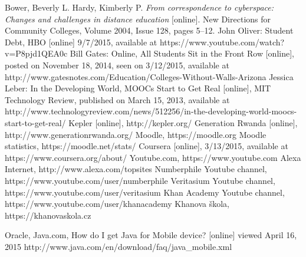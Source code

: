 
\def\bibname{Bibliography}
\begin{thebibliography}{99}
\addcontentsline{toc}{chapter}{\bibname}


{\sc Bower,} Beverly L. {\sc Hardy,} Kimberly P.
\emph{From correspondence to cyberspace: Changes and challenges in distance education} [online].
New Directions for Community Colleges, Volume 2004, Issue 128, pages 5–12.
John Oliver: Student Debt, HBO [online] 9/7/2015, available at https://www.youtube.com/watch?v=P8pjd1QEA0c
Bill Gates: Online, All Students Sit in the Front Row [online], posted on November 18, 2014, seen on 3/12/2015, available at http://www.gatesnotes.com/Education/Colleges-Without-Walls-Arizona
Jessica Leber: In the Developing World, MOOCs Start to Get Real [online], MIT Technology Review, published on March 15, 2013, available at http://www.technologyreview.com/news/512256/in-the-developing-world-moocs-start-to-get-real/
Kepler [online], http://kepler.org/
Generation Rwanda [online], http://www.generationrwanda.org/
Moodle, https://moodle.org
Moodle statistics, https://moodle.net/stats/
Coursera [online], 3/13/2015, available at https://www.coursera.org/about/
Youtube.com, https://www.youtube.com
Alexa Internet, http://www.alexa.com/topsites
Numberphile Youtube channel, https://www.youtube.com/user/numberphile
Veritasium Youtube channel, https://www.youtube.com/user/veritasium
Khan Academy Youtube channel, https://www.youtube.com/user/khanacademy
Khanova škola, https://khanovaskola.cz



\bibitem{}
Oracle, Java.com, How do I get Java for Mobile device? [online] viewed April 16, 2015
http://www.java.com/en/download/faq/java_mobile.xml


\bibitem{}


\end{thebibliography}
